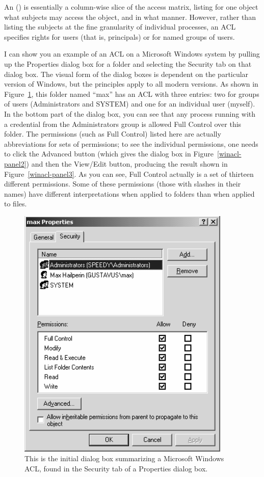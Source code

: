 An  () is essentially a
column-wise slice of the access matrix, listing for one object what
subjects may access the object, and in what manner.  However, rather
than listing the subjects at the fine granularity of individual
processes, an ACL specifies rights for users (that is, principals) or
for named groups of users.

I can show you an example of an ACL on a Microsoft Windows system by
pulling up the Properties dialog box for a folder and selecting the Security tab on that dialog box.  The
visual form of the dialog boxes is dependent on the particular version of
Windows, but the principles apply to all modern versions.  As
shown in Figure~\ref{winacl-panel1}, this folder named
``max'' has an ACL with three
entries: two for groups of users (Administrators and SYSTEM) and one
for an individual user (myself).  In the bottom part of the dialog box, you
can see that any process running with a credential from the
Administrators group is allowed Full Control over this folder.  The
permissions (such as Full Control) listed here are actually
abbreviations for sets of permissions; to see the individual
permissions, one needs to click the Advanced button (which gives the
dialog box in Figure~\ref{winacl-panel2}) and then the View/Edit button,
producing the result shown in Figure~\ref{winacl-panel3}.  As you can
see, Full Control actually is a set of thirteen different permissions.  Some
of these permissions (those with slashes in their names) have
different interpretations when applied to folders than when applied to
files.
\begin{figure}
\centerline{\includegraphics{hail_f0713}}
\caption{This is the initial dialog box summarizing a Microsoft Windows
  ACL, found in the Security tab of a Properties dialog box.}
\label{winacl-panel1}
\end{figure}
